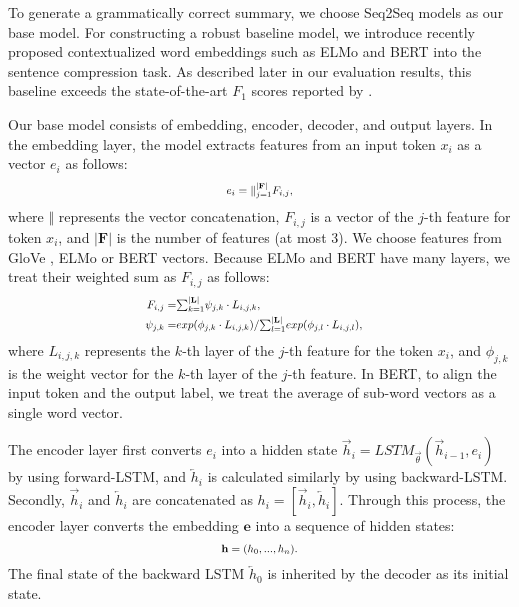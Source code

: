 \documentclass[letterpaper]{article} \usepackage{aaai20}  \usepackage{times}  \usepackage{helvet} \usepackage{courier}  \usepackage[hyphens]{url}  \usepackage{graphicx} \urlstyle{rm} \def\UrlFont{\rm}  \usepackage{graphicx}  \frenchspacing  \setlength{\pdfpagewidth}{8.5in}  \setlength{\pdfpageheight}{11in}  \usepackage{tabu}
\newcommand{\newcite}[1]{\citeauthor{#1} \shortcite{#1}}
\begin{document}
To generate a grammatically correct summary, we choose Seq2Seq models as our base model.
For constructing a robust baseline model, we introduce recently proposed contextualized word embeddings such as ELMo \cite{peters-etal-2018-deep} and BERT \cite{devlin2018bert} into the sentence compression task.
As described later in our evaluation results, this baseline exceeds the state-of-the-art $F_{1}$ scores reported by \newcite{zhao-etal-2018-language}.

Our base model consists of embedding, encoder, decoder, and output layers.
In the embedding layer, the model extracts features from an input token $x_{i}$ as a vector $e_{i}$ as follows:
\begin{equation}
\scalebox{0.8}{$
e_{i} = {\Vert}_{j=1}^{|\mathbf{F}|}F_{i,j},
\label{eq:embed}
$}
\end{equation}
where $\Vert$ represents the vector concatenation, $F_{i,j}$ is
a vector of the $j$-th feature for token $x_{i}$, and $|\mathbf{F}|$ is the number of features (at most 3). We choose features from GloVe \cite{pennington2014glove}, ELMo or BERT vectors.
Because ELMo and BERT have many layers, we treat their weighted sum as $F_{i,j}$ as follows:
\begin{equation}
\scalebox{0.8}{$
\begin{aligned}
F_{i,j} =& {\textstyle\sum}_{k=1}^{|\mathbf{L}|}\psi_{j,k} \cdot L_{i,j,k},&\\
\psi_{j,k} =& exp(\phi_{j,k} \cdot L_{i,j,k}) / {\textstyle\sum}_{l=1}^{|\mathbf{L}|}exp(\phi_{j,l} \cdot L_{i,j,l}),&
\end{aligned}
$}
\end{equation}
where $L_{i,j,k}$ represents the
$k$-th layer of the $j$-th feature for the token $x_{i}$, and $\phi_{j,k}$ is the weight vector for
the $k$-th layer of the $j$-th feature. In BERT, to align the input token and the output label, we treat the average of sub-word vectors as a single word vector.

The encoder layer first converts $e_{i}$ into a hidden state $\overrightarrow{h}_{i} = LSTM_{\overrightarrow{\theta}}(\overrightarrow{h}_{i-1}, e_{i})$ by using forward-LSTM, and $\overleftarrow{h}_{i}$ is calculated similarly by using backward-LSTM.
Secondly, $\overrightarrow{h}_{i}$ and $\overleftarrow{h}_{i}$ are concatenated as $h_{i}= [\overrightarrow{h}_{i}, \overleftarrow{h}_{i}]$.
Through this process, the encoder layer converts the embedding $\mathbf{e}$ into a sequence of hidden states:
\begin{equation}
\scalebox{0.8}{$
\mathbf{h} = (h_{0}, ..., h_{n}).
$}
\label{eq:enc_hidden}
\end{equation}
The final state of the backward LSTM $\overleftarrow{h}_{0}$ is inherited by the decoder as its initial state.
\end{document}
